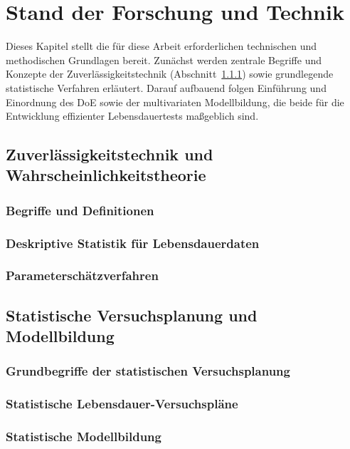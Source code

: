 
\chapter{Stand der Forschung und Technik} \label{chap.Std}

Dieses Kapitel stellt die für diese Arbeit erforderlichen technischen und methodischen Grundlagen bereit. Zunächst werden zentrale Begriffe und Konzepte der Zuverlässigkeitstechnik (Abschnitt~\ref{subsec.BegriffeZUV}) sowie grundlegende statistische Verfahren erläutert. Darauf aufbauend folgen Einführung und Einordnung des DoE sowie der multivariaten Modellbildung, die beide für die Entwicklung effizienter Lebensdauertests maßgeblich sind.

\section{Zuverlässigkeitstechnik und Wahrscheinlichkeitstheorie} \label{sec.Zuv}
\subsection{Begriffe und Definitionen} \label{subsec.BegriffeZUV}
\subsection{Deskriptive Statistik für Lebensdauerdaten} \label{subsec.Stat}
\subsection{Parameterschätzverfahren} \label{subsec.Schätzer}
\section{Statistische Versuchsplanung und Modellbildung} \label{sec.DoE}
\subsection{Grundbegriffe der statistischen Versuchsplanung} \label{subsec.BegriffeDoE}
\subsection{Statistische Lebensdauer-Versuchspläne} \label{subsec.Pläne}
\subsection{Statistische Modellbildung} \label{subsec.Model}
